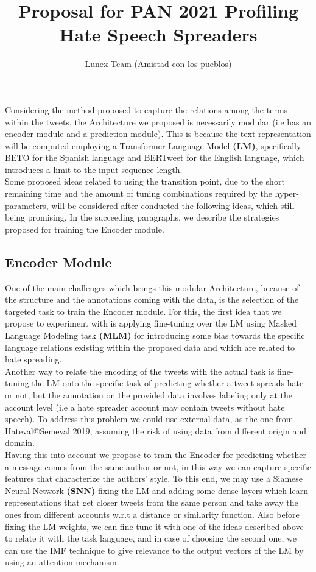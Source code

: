 \documentclass[11pt]{article}
\title{Proposal for PAN 2021 Profiling Hate Speech Spreaders}
\author{Lunex Team (Amistad con los pueblos)}
\date{}
\begin{document}
	\maketitle 	
	
	Considering the method proposed to capture the relations among the terms within the tweets,  the Architecture we proposed is necessarily modular (i.e has an encoder module and a prediction module). This is because the text representation will be computed employing a Transformer Language Model \textbf{(LM)}, specifically BETO for the Spanish language and BERTweet for the English language, which introduces a limit to the input sequence length.  \\	
	Some proposed ideas related to using the transition point, due to the short remaining time and the amount of tuning combinations required by the hyper-parameters, will be considered after conducted the following ideas, which still being promising.  In the succeeding paragraphs, we describe the strategies proposed for training the Encoder module.	
	
	\subsection*{Encoder Module}
	
	One of the main challenges which brings this modular Architecture, because of the structure and the annotations coming with the data, is the selection of the targeted task to train the Encoder module. For this, the first idea that we propose to experiment with is applying fine-tuning over the LM  using Masked Language Modeling task \textbf{(MLM) }for introducing some bias towards the specific language relations existing within the proposed data and which are related to hate spreading.\\
	
	Another way to relate the encoding of the tweets with the actual task is fine-tuning the LM onto the specific task of predicting whether a tweet spreads hate or not, but the annotation on the provided data involves labeling only at the account level (i.e a hate spreader account may contain tweets without hate speech). To address this problem we could use external data, as the one from Hateval@Semeval 2019, assuming the risk of using data from different origin and domain.\\
	Having this into account we propose to train the Encoder for predicting whether a message comes from the same author or not, in this way we can capture specific features that characterize the authors' style.  To this end, we may use a Siamese Neural Network \textbf{(SNN)} fixing the LM and adding some dense layers which learn representations that get closer tweets from the same person and take away the ones from different accounts w.r.t a distance or similarity function. Also before fixing the LM weights, we can fine-tune it with one of the ideas described above to relate it with the task language, and in case of choosing the second one, we can use the IMF technique to give relevance to the output vectors of the LM by using an attention mechanism. \\
	
\end{document}
